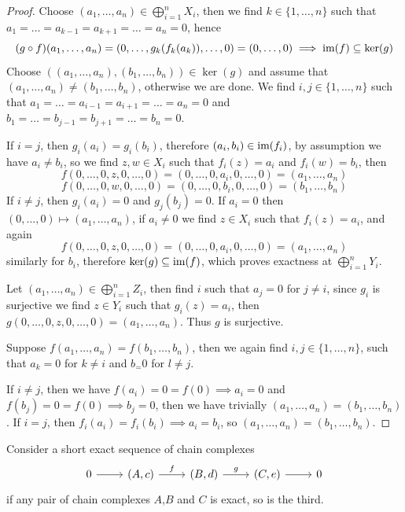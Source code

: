 \begin{proof}[Proof]
    Choose $(a_1,\dots, a_n)\in\bigoplus_{i=1}^n X_i$, then we find $k\in\{1,\dots,n\}$ 
    such that $a_1=\dots=a_{k-1}=a_{k+1}=\dots=a_n=0$, hence 
    \[
        (g\circ f)(a_1,\dots, a_n) = (0,\dots,g_k(f_k(a_k)),\dots,0) = (0,\dots,0)\implies\text{im}(f)\subseteq\ker(g)
    \]
    Choose $((a_1,\dots,a_n),(b_1,\dots,b_n))\in\ker(g)$ and assume that $(a_1,\dots,a_n)\neq(b_1,\dots,b_n)$, 
    otherwise we are done. We find $i,j\in\{1,\dots,n\}$ such that 
    $a_1=\dots=a_{i-1}=a_{i+1}=\dots=a_n=0$ and $b_1=\dots=b_{j-1}=b_{j+1}=\dots=b_n=0$. \par 
    If $i=j$, then $g_i(a_i)=g_i(b_i)$, therefore $(a_i,b_i)\in\text{im}(f_i)$, by assumption we have $a_i\neq b_i$, so 
    we find $z,w\in X_i$ such that $f_i(z)=a_i$ and $f_i(w)=b_i$, then 
    \[
        f(0,\dots,0,z,0,\dots,0) = (0,\dots,0,a_i,0,\dots,0) = (a_1,\dots, a_n)
    \]
    \[
        f(0,\dots,0,w,0,\dots,0) = (0,\dots,0,b_i,0,\dots,0) = (b_1,\dots, b_n)
    \]
    If $i\neq j$, then $g_i(a_i) = 0$ and $g_j(b_j) = 0$. If $a_i=0$ then $(0,\dots,0)\mapsto(a_1,\dots,a_n)$, if 
    $a_i\neq 0$ we find $z\in X_i$ such that $f_i(z)=a_i$, and again 
    \[
        f(0,\dots,0,z,0,\dots,0) = (0,\dots,0,a_i,0,\dots,0) = (a_1,\dots, a_n)
    \]
    similarly for $b_i$, therefore $\ker(g)\subseteq\text{im}(f)$, which proves exactness at $\bigoplus_{i=1}^n Y_i$.\par 
    Let $(a_1,\dots,a_n)\in\bigoplus_{i=1}^n Z_i$, then find $i$ such that $a_j=0$ for $j\neq i$, since 
    $g_i$ is surjective we find $z\in Y_i$ such that $g_i(z)=a_i$, then $g(0,\dots,0,z,0,\dots,0) = (a_1,\dots,a_n)$.
    Thus $g$ is surjective.\par 
    Suppose $f(a_1,\dots,a_n)=f(b_1,\dots,b_n)$, then we again find $i,j\in\{1,\dots,n\}$, such that 
    $a_k=0$ for $k\neq i$ and $b_=0$ for $l\neq j$. \par If $i\neq j$, then we have $f(a_i)=0=f(0) \implies a_i=0$ and 
    $f(b_j)=0=f(0) \implies b_j=0$, then we have trivially $(a_1,\dots,a_n)=(b_1,\dots,b_n)$. 
    If $i=j$, then $f_i(a_i)=f_i(b_i) \implies a_i=b_i$, so $(a_1,\dots,a_n)=(b_1,\dots,b_n)$. 
\end{proof}
\begin{proposition}
    Consider a short exact sequence of chain complexes
    \[\begin{tikzcd}
	0 & {(A,c)} & {(B,d)} & {(C,e)} & 0
	\arrow[from=1-1, to=1-2]
	\arrow["f", from=1-2, to=1-3]
	\arrow["g", from=1-3, to=1-4]
	\arrow[from=1-4, to=1-5]
    \end{tikzcd}\]
    if any pair of chain complexes $A$,$B$ and $C$ is exact, so is the third.
\end{proposition}
